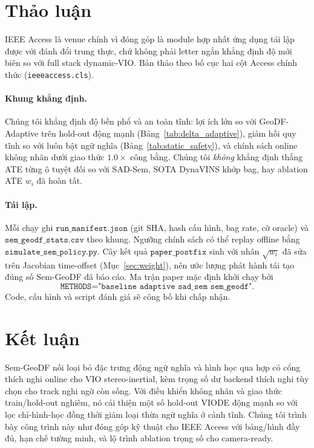 \documentclass{ieeeaccess}
\begin{document}
\section{Thảo luận}
IEEE Access là venue chính vì đóng góp là module hợp nhất ứng dụng tái lập được với đánh đổi trung thực, chứ không phải letter ngắn khẳng định độ mới biên so với full stack dynamic-VIO.
Bản thảo theo bố cục hai cột Access chính thức (\texttt{ieeeaccess.cls}).

\paragraph{Khung khẳng định.}
Chúng tôi khẳng định độ bền phổ và an toàn tĩnh: lợi ích lớn so với GeoDF-Adaptive trên hold-out động mạnh (Bảng~\ref{tab:delta_adaptive}), giảm hồi quy tĩnh so với luôn bật ngữ nghĩa (Bảng~\ref{tab:static_safety}), và chính sách online không nhãn dưới giao thức \(1.0\times\) công bằng.
Chúng tôi \emph{không} khẳng định thắng ATE từng ô tuyệt đối so với SAD-Sem, SOTA DynaVINS khớp bag, hay ablation ATE \(w_i\) đã hoàn tất.

\paragraph{Tái lập.}
Mỗi chạy ghi \(\texttt{run\_manifest.json}\) (git SHA, hash cấu hình, bag rate, cờ oracle) và \(\texttt{sem\_geodf\_stats.csv}\) theo khung.
Ngưỡng chính sách có thể replay offline bằng \(\texttt{simulate\_sem\_policy.py}\).
Cây kết quả \(\texttt{paper\_postfix}\) sinh với nhân \(\sqrt{w_i}\) đã sửa trên Jacobian time-offset (Mục~\ref{sec:weight}), nên ước lượng phát hành tái tạo đúng số Sem-GeoDF đã báo cáo.
Ma trận paper mặc định khởi chạy bởi
\[\texttt{METHODS="baseline adaptive sad\_sem sem\_geodf"}.\]
Code, cấu hình và script đánh giá sẽ công bố khi chấp nhận.

\section{Kết luận}
Sem-GeoDF nối loại bỏ đặc trưng động ngữ nghĩa và hình học qua hợp có cổng thích nghi online cho VIO stereo-inertial, kèm trọng số dư backend thích nghi tùy chọn cho track nghi ngờ còn sống.
Với điều khiển không nhãn và giao thức train/hold-out nghiêm, nó cải thiện một số hold-out VIODE động mạnh so với lọc chỉ-hình-học đồng thời giảm loại thừa ngữ nghĩa ở cảnh tĩnh.
Chúng tôi trình bày công trình này như đóng góp kỹ thuật cho IEEE Access với bảng/hình đầy đủ, hạn chế tường minh, và lộ trình ablation trọng số cho camera-ready.
\end{document}
